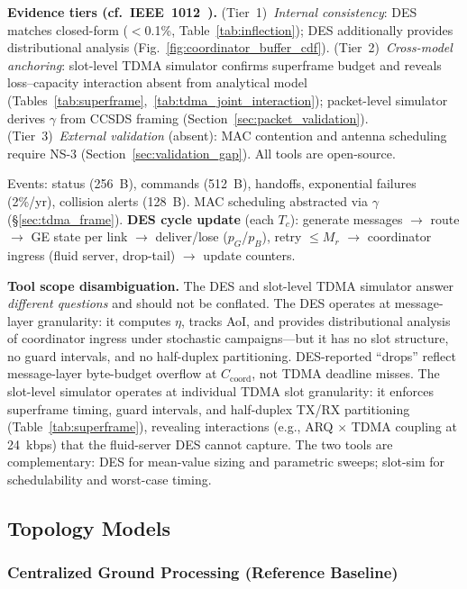 \documentclass[journal]{IEEEtran}
\begin{document}
\textbf{Evidence tiers (cf.\ IEEE~1012~\cite{ieee_1012}).} (Tier~1)~\emph{Internal consistency}: DES matches closed-form ($<$0.1\%, Table~\ref{tab:inflection}); DES additionally provides distributional analysis (Fig.~\ref{fig:coordinator_buffer_cdf}). (Tier~2)~\emph{Cross-model anchoring}: slot-level TDMA simulator confirms superframe budget and reveals loss--capacity interaction absent from analytical model (Tables~\ref{tab:superframe},~\ref{tab:tdma_joint_interaction}); packet-level simulator derives $\gamma$ from CCSDS framing (Section~\ref{sec:packet_validation}). (Tier~3)~\emph{External validation} (absent): MAC contention and antenna scheduling require NS-3 (Section~\ref{sec:validation_gap}). All tools are open-source.

Events: status (256~B), commands (512~B), handoffs, exponential failures (2\%/yr), collision alerts (128~B). MAC scheduling abstracted via $\gamma$ (\S\ref{sec:tdma_frame}). \textbf{DES cycle update} (each $T_c$): generate messages $\to$ route $\to$ GE state per link $\to$ deliver/lose ($p_G$/$p_B$), retry $\leq M_r$ $\to$ coordinator ingress (fluid server, drop-tail) $\to$ update counters.

\textbf{Tool scope disambiguation.} The DES and slot-level TDMA simulator answer \emph{different questions} and should not be conflated. The DES operates at message-layer granularity: it computes $\eta$, tracks AoI, and provides distributional analysis of coordinator ingress under stochastic campaigns---but it has no slot structure, no guard intervals, and no half-duplex partitioning. DES-reported ``drops'' reflect message-layer byte-budget overflow at $C_{\text{coord}}$, not TDMA deadline misses. The slot-level simulator operates at individual TDMA slot granularity: it enforces superframe timing, guard intervals, and half-duplex TX/RX partitioning (Table~\ref{tab:superframe}), revealing interactions (e.g., ARQ $\times$ TDMA coupling at 24~kbps) that the fluid-server DES cannot capture. The two tools are complementary: DES for mean-value sizing and parametric sweeps; slot-sim for schedulability and worst-case timing.

\subsection{Topology Models}

\subsubsection{Centralized Ground Processing (Reference Baseline)}
\end{document}
